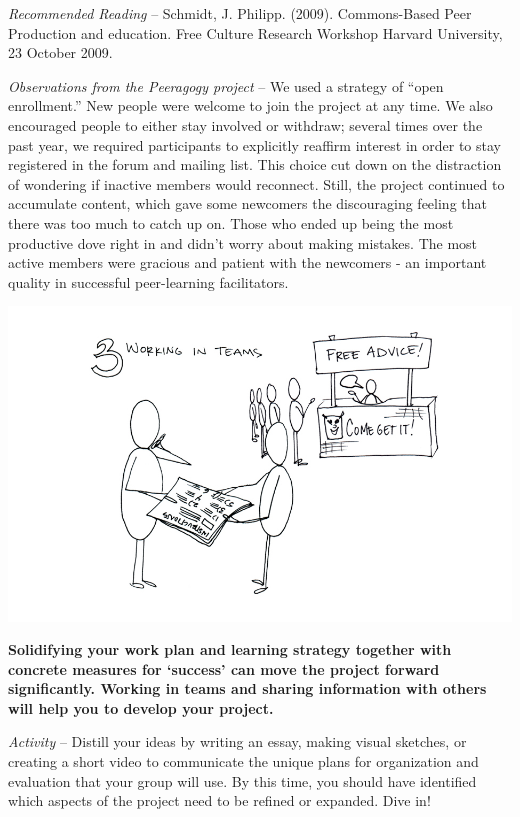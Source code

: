 \emph{Recommended Reading} -- Schmidt, J. Philipp. (2009). Commons-Based
Peer Production and education. Free Culture Research Workshop Harvard
University, 23 October 2009.

\emph{Observations from the Peeragogy project} -- We used a strategy of
``open enrollment.'' New people were welcome to join the project at any
time. We also encouraged people to either stay involved or withdraw;
several times over the past year, we required participants to explicitly
reaffirm interest in order to stay registered in the forum and mailing
list. This choice cut down on the distraction of wondering if inactive
members would reconnect. Still, the project continued to accumulate
content, which gave some newcomers the discouraging feeling that there
was too much to catch up on. Those who ended up being the most
productive dove right in and didn't worry about making mistakes. The
most active members were gracious and patient with the newcomers - an
important quality in successful peer-learning facilitators.

\begin{center}
\includegraphics{../pictures/OpenBook-2-3.jpg}
\end{center}

\textbf{Solidifying your work plan and learning strategy together with
concrete measures for `success' can move the project forward
significantly. Working in teams and sharing information with others will
help you to develop your project.}

\emph{Activity} -- Distill your ideas by writing an essay, making visual
sketches, or creating a short video to communicate the unique plans for
organization and evaluation that your group will use. By this time, you
should have identified which aspects of the project need to be refined
or expanded. Dive in!

